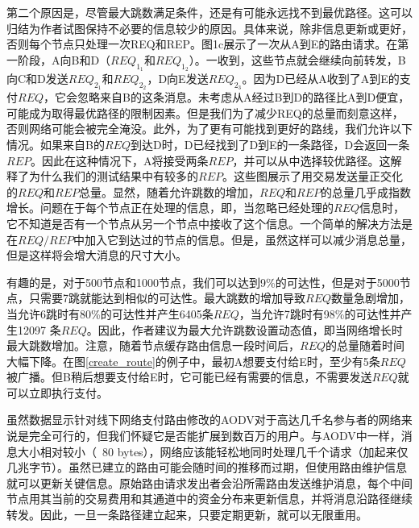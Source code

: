 \documentclass[12pt,a4paper]{article}
\begin{document}
第二个原因是，尽管最大跳数满足条件，还是有可能永远找不到最优路径。这可以归结为作者试图保持不必要的信息较少的原因。具体来说，除非信息更新或更好，否则每个节点只处理一次REQ和REP。图1c展示了一次从A到E的路由请求。在第一阶段，A向B和D（$REQ_{1_1}$和$REQ_{1_2}$）。一收到，这些节点就会继续向前转发，B向C和D发送$REQ_{2_1}$和$REQ_{2_2}$，D向E发送$REQ_{2_3}$。因为D已经从A收到了A到E的支付$REQ$，它会忽略来自B的这条消息。未考虑从A经过B到D的路径比A到D便宜，可能成为取得最优路径的限制因素。但是我们为了减少REQ的总量而刻意这样，否则网络可能会被完全淹没。此外，为了更有可能找到更好的路线，我们允许以下情况。如果来自B的$REQ$到达D时，D已经找到了D到E的一条路径，D会返回一条$REP$。因此在这种情况下，A将接受两条$REP$，并可以从中选择较优路径。这解释了为什么我们的测试结果中有较多的$REP$。这些图展示了用交易发送量正交化的$REQ$和$REP$总量。显然，随着允许跳数的增加，$REQ$和$REP$的总量几乎成指数增长。问题在于每个节点正在处理的信息，即，当忽略已经处理的$REQ$信息时，它不知道是否有一个节点从另一个节点中接收了这个信息。一个简单的解决方法是在$REQ/REP$中加入它到达过的节点的信息。但是，虽然这样可以减少消息总量，但是这样将会增大消息的尺寸大小。

有趣的是，对于500节点和1000节点，我们可以达到9\%的可达性，但是对于5000节点，只需要7跳就能达到相似的可达性。最大跳数的增加导致$REQ$数量急剧增加，当允许6跳时有80\%的可达性并产生6405条$REQ$，当允许7跳时有98\%的可达性并产生12097 条$REQ$。因此，作者建议为最大允许跳数设置动态值，即当网络增长时最大跳数增加。注意，随着节点缓存路由信息一段时间后，$REQ$的总量随着时间大幅下降。在图\ref{create_route}的例子中，最初A想要支付给E时，至少有5条$REQ$被广播。但B稍后想要支付给E时，它可能已经有需要的信息，不需要发送$REQ$就可以立即执行支付。

虽然数据显示针对线下网络支付路由修改的AODV对于高达几千名参与者的网络来说是完全可行的，但我们怀疑它是否能扩展到数百万的用户。与AODV中一样，消息大小相对较小（~80 bytes），网络应该能轻松地同时处理几千个请求（加起来仅几兆字节）。虽然已建立的路由可能会随时间的推移而过期，但使用路由维护信息就可以更新关键信息。原始路由请求发出者会沿所需路由发送维护消息，每个中间节点用其当前的交易费用和其通道中的资金分布来更新信息，并将消息沿路径继续转发。因此，一旦一条路径建立起来，只要定期更新，就可以无限重用。
\end{document}
